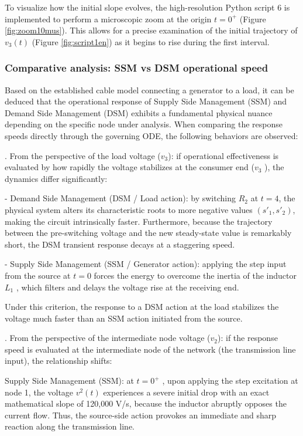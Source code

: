 \documentclass[energies,accept,oneauthor,pdftex]{Definitions/mdpi}
\begin{document}
To visualize how the initial slope evolves, the high-resolution Python script 6 is implemented to perform a microscopic  zoom at the origin $t = 0^+$ (Figure \ref{fig:zoom10mus}). This allows for a precise examination of the initial trajectory of $v_3 (t)$ (Figure \ref{fig:script1en}) as it begins to rise during the first interval.


\subsubsection*{Comparative analysis: SSM vs DSM operational speed}

Based on the established cable model connecting a generator to a load, it can be deduced that the operational response of Supply Side Management (SSM) and Demand Side Management (DSM) exhibits a fundamental physical nuance depending on the specific node under analysis. When comparing the response speeds directly through the governing ODE, the following behaviors are observed:


\medskip{}. From the perspective of the load voltage ($v_3$): if operational effectiveness is evaluated by how rapidly the voltage stabilizes at the consumer end ($v_3$ ), the dynamics differ significantly:

\medskip
- Demand Side Management (DSM / Load action): by switching $R_2$ at $t = 4$,
the physical system alters its characteristic roots to more negative values
$(s'_1 , s'_2)$, making the circuit intrinsically faster. Furthermore, because the trajectory between the pre-switching voltage and the new steady-state value is remarkably short, the DSM transient response decays at a staggering speed.

\medskip
- Supply Side Management (SSM / Generator action): applying the step input
from the source at $t = 0$ forces the energy to overcome the inertia of the
inductor $L_1$ , which filters and delays the voltage rise at the receiving end.

Under this criterion, the response to a DSM action at the load stabilizes the voltage much faster than an SSM action initiated from the source.

\medskip{}. From the perspective of the intermediate node voltage ($v_2$): if the response speed is evaluated at the intermediate node of the network (the transmission line input), the relationship shifts:

\medskip
Supply Side Management (SSM): at $t = 0^+$ , upon applying the step excitation
at node 1, the voltage $v^2(t)$ experiences a severe initial drop with an exact
mathematical slope of 120,000 V\!/s, because the inductor abruptly opposes
the current flow. Thus, the source-side action provokes an immediate and
sharp reaction along the transmission line.
\end{document}

